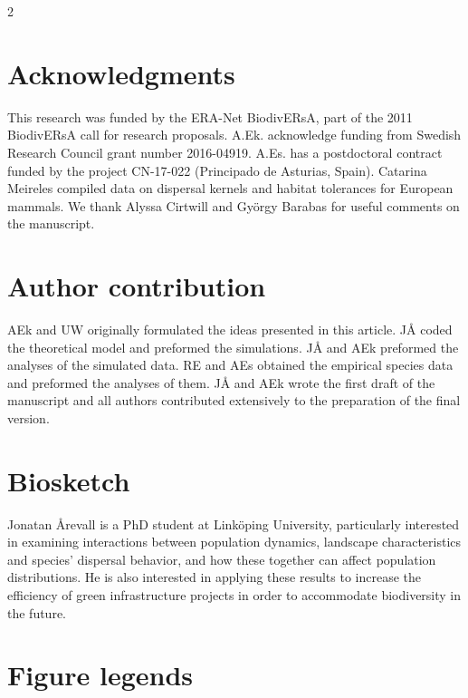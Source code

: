 \documentclass[12pt,pdftex]{article}
\begin{document}
\begin{spacing}{2}
\section*{Acknowledgments}
This research was funded by the ERA-Net BiodivERsA, part of the 2011 BiodivERsA call for research proposals. A.Ek. acknowledge funding from Swedish Research Council grant number 2016-04919. A.Es. has a postdoctoral contract funded by the project CN-17-022 (Principado de Asturias, Spain). Catarina Meireles compiled data on dispersal kernels and habitat tolerances for European mammals. We thank Alyssa Cirtwill and Gy\"{o}rgy Barabas for useful comments on the manuscript. 

%
     

%

 
\clearpage

\section*{Author contribution}
AEk and UW originally formulated the ideas presented in this article. J\r{A} coded the theoretical model and preformed the simulations. J\r{A} and AEk preformed the analyses of the simulated data. RE and AEs obtained the empirical species data and preformed the  analyses of them. J\r{A} and AEk wrote the first draft of the manuscript and all authors contributed extensively to the preparation of the final version.

\section*{Biosketch}
Jonatan \r{A}revall is a PhD student at Link\"{o}ping University, particularly interested in examining interactions between population dynamics, landscape characteristics and species’ dispersal behavior, and how these together can affect population distributions. He is also interested in applying these results to increase the efficiency of green infrastructure projects in order to accommodate biodiversity in the future.

\clearpage

\section*{Figure legends}


\end{spacing}
\end{document}
